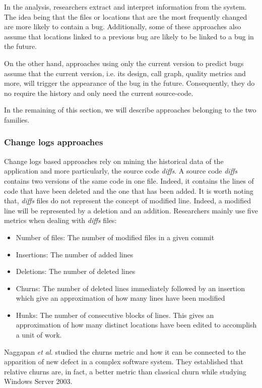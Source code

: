 In the  analysis, researchers extract and interpret information from  the system.
The idea being that the files or locations that are the most frequently changed are more likely to contain a bug.
Additionally, some of these approaches also assume that locations linked to a previous bug are likely to be linked to a bug in the future.

On the other hand, approaches using only the current version to predict bugs assume that the current version, i.e. its design, call graph, quality metrics and more, will trigger the appearance of the bug in the future.
Consequently, they do no require the history and only need the current source-code.

In the remaining of this section, we will describe approaches belonging to the two families.

\subsubsection{Change logs approaches}
\label{subs:Change logs approaches}

Change logs based approaches rely on mining the historical data of the application and more particularly, the source code \textit{diffs}.
A source code \textit{diffs} contains two versions of the same code in one file.
Indeed, it contains the lines of code that have been deleted and the one that has been added.
It is worth noting that, \textit{diffs} files do not represent the concept of modified line.
Indeed, a modified line will be represented by a deletion and an addition.
Researchers mainly use five metrics when dealing with \textit{diffs} files:

\begin{itemize}
  \item Number of files: The number of modified files in a given commit
  \item Insertions: The number of added lines
  \item Deletions: The number of deleted lines
  \item Churns: The number of deleted lines immediately followed by an insertion which give an approximation of how many lines have been modified
  \item Hunks: The number of consecutive blocks of lines. This gives an approximation of how many distinct locations have been edited to accomplish a unit of work.
\end{itemize}

Naggapan \textit{et al.} studied the churns metric and how it can be connected to the apparition of new defect in a complex software system.
They established that relative churns are, in fact, a better metric than classical churn \cite{Nagappan} while studying Windows Server 2003.

